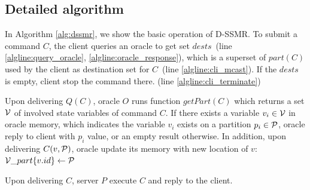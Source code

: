 \subsection{Detailed algorithm}
\label{sec:detailalg}

In Algorithm \ref{alg:dssmr}, we show the basic operation of D-SSMR. 
To submit a command $C$, the client queries an oracle to get set $dests$~(line \ref{algline:query_oracle}, \ref{algline:oracle_response}), which is a superset of $part(C)$ used by the client as destination set for $C$~(line \ref{algline:cli_mcast}). If the $dests$ is empty, client stop the command there. (line \ref{algline:cli_terminate})

Upon delivering $Q(C)$, oracle $O$ runs function $getPart(C)$ which returns a set $\mathcal{V}$ of involved state variables of command $C$. If there exists a variable $v_i \in \mathcal{V}$ in oracle memory, which indicates the variable $v_i$ exists on a partition $p_i \in \mathcal{P}$, oracle reply to client with $p_i$ value, or an empty result otherwise. In addition, upon delivering $C(v, \mathcal{P})$, oracle update its memory with new location of $v$: $\mathcal{V}\_part\{v.id\} \leftarrow \mathcal{P}$

Upon delivering $C$, server $P$ execute $C$ and reply to the client. 


